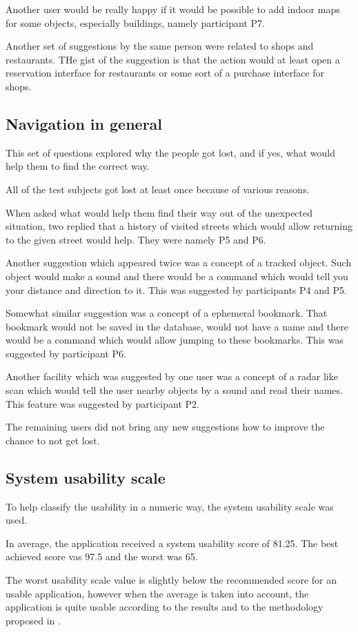 \documentclass[nolof,digital]{fithesis3}
\begin{document}
Another user would be really happy if it would be possible to add indoor maps for some objects, especially buildings, namely participant P7.

Another  set of suggestions by the same person were related to shops and restaurants. THe gist of the suggestion is that the action would at least open a reservation interface for restaurants or some sort of a purchase interface for shops.
\subsection{Navigation in general}
This set of questions explored why the people got lost, and if yes, what would help them to find the correct way.

All of the test subjects got lost at least once because of various reasons.

When asked what would help them find their way out of the unexpected situation, two replied that a history of visited streets which would allow returning to the given street would help. They were namely P5 and P6.

Another suggestion which appeared twice was a concept of a tracked object. Such object would make a sound and there would be a command which would tell you your distance and direction to it. This was suggested by participants P4 and P5.

Somewhat similar suggestion was a concept of a ephemeral bookmark. That bookmark would not be saved in the database, would not have a name and there would be a command which would allow jumping to these bookmarks. This was suggested by participant P6.

Another facility which was suggested by one user was a concept of a radar like scan which would tell the user nearby objects by a sound and read their names. This feature was suggested by participant P2.

The  remaining users did not bring any new suggestions how to improve the chance to not get lost.
\subsection{System usability scale}
To help classify the usability in a numeric way, the system usability scale was used.

In average, the application received a system usability score of 81.25. The best achieved score vas 97.5 and the worst was 65.

The worst usability scale value is slightly below the recommended score for an usable application, however when the average is taken into account, the application is quite usable according to the results and to the methodology proposed in \parencite{SauroJeff2012Qtue}.
\end{document}
